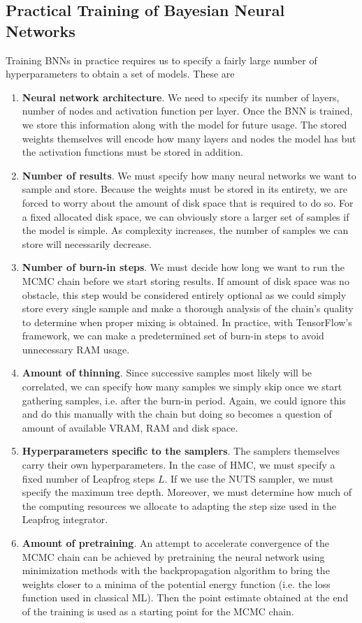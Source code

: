 \subsection{Practical Training of Bayesian Neural Networks}

Training BNNs in practice requires us to specify a fairly large number of hyperparameters to obtain a set of models. These are 
\begin{enumerate}
  \item \textbf{Neural network architecture}. We need to specify its number of layers, number of nodes and activation function per layer. 
  Once the BNN is trained, we store this information along with the model for future usage. The stored weights themselves will encode how many layers and nodes the model has but the activation functions must be stored in addition.
  \item \textbf{Number of results}. We must specify how many neural networks we want to sample and store. Because the weights must be stored in its entirety, we are forced to worry about the amount of disk space that is required to do so. For a fixed allocated disk space, we can obviously store a larger set of samples if the model is simple. As complexity increases, the number of samples we can store will necessarily decrease.
  \item \textbf{Number of burn-in steps}. We must decide how long we want to run the MCMC chain before we start storing results. If amount of disk space was no obstacle, this step would be considered entirely optional as we could simply store every single sample and make a thorough analysis of the chain's quality to determine when proper mixing is obtained. In practice, with TensorFlow's framework, we can make a predetermined set of burn-in steps to avoid unnecessary RAM usage.
  \item \textbf{Amount of thinning}. Since successive samples most likely will be correlated, we can specify how many samples we simply skip once we start gathering samples, i.e. after the burn-in period. Again, we could ignore this and do this manually with the chain but doing so becomes a question of amount of available VRAM, RAM and disk space. 
  \item \textbf{Hyperparameters specific to the samplers}. The samplers themselves carry their own hyperparameters. In the case of HMC, we must specify a fixed number of Leapfrog steps $L$. If we use the NUTS sampler, we must specify the maximum tree depth. Moreover, we must determine how much of the computing resources we allocate to adapting the step size used in the Leapfrog integrator.
  \item \textbf{Amount of pretraining}. An attempt to accelerate convergence of the MCMC chain can be achieved by pretraining the neural network using minimization methods with the backpropagation algorithm to bring the weights closer to a minima of the potential energy function (i.e. the loss function used in classical ML). Then the point estimate obtained at the end of the training is used as a starting point for the MCMC chain.
\end{enumerate}

